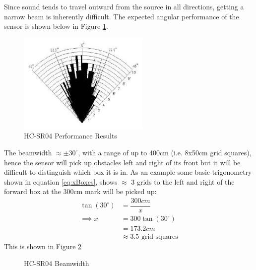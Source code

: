 \documentclass[11pt]{article}
\newcommand{\degrees}{^\circ}
\begin{document}
					Since sound tends to travel outward from the source in all directions, getting a narrow beam is inherently difficult. The expected angular performance of the sensor is shown below in Figure \ref{fig:hcsr04Performance}.
					
					\begin{figure}[H]
						\centering
						\includegraphics[width = 0.4\linewidth]{Images/hcsr04Performance.jpg}
						\caption{HC-SR04 Performance Results \cite{hcsr04Manual}}
						\label{fig:hcsr04Performance}
					\end{figure}
				
					The beamwidth $\approx \pm 30\degrees$, with a range of up to 400cm (i.e. 8x50cm grid squares), hence the sensor will pick up obstacles left and right of its front but it will be difficult to distinguish which box it is in. As an example some basic trigonometry shown in equation \ref{eq:xBoxes}, shows $\approx$ 3 grids to the left and right of the forward box at the 300cm mark will be picked up:
					\begin{align}\label{eq:xBoxes}
						\tan(30\degrees) 	& = \dfrac{300cm}{x}\nonumber\\
						\implies x			& = 300\tan(30\degrees)\nonumber\\
								 			& = 173.2cm\nonumber\\
											& \approx 3.5 \text{ grid squares}
					\end{align}
					This is shown in Figure \ref{fig:beamwidth}
					\begin{figure}[H]
						\begin{center}
							\caption{HC-SR04 Beamwidth}
							\label{fig:beamwidth}
						\end{center}
					\end{figure}
				
\end{document}
